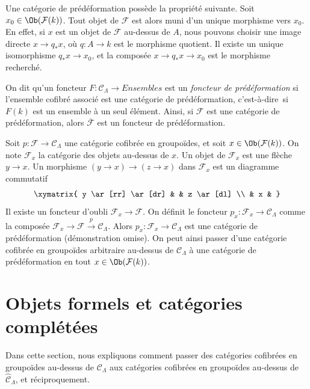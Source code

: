 \noindent
Une catégorie de prédéformation possède la propriété suivante.
Soit $x_0 \in \Ob(\mathcal{F}(k))$. Tout objet de $\mathcal{F}$ est alors
muni d'un unique morphisme vers $x_0$. En effet, si $x$ est un objet de
$\mathcal{F}$ au-dessus de $A$, nous pouvons choisir une image directe
$x \to q_*x$, où $q : A \to k$ est le morphisme quotient. Il existe un unique
isomorphisme $q_*x \to x_0$, et la composée $x \to q_*x \to x_0$ est le
morphisme recherché.

\begin{remark}
\label{remark-predeformation-functor}
On dit qu'un foncteur $F: \mathcal{C}_\Lambda \to \textit{Ensembles}$ est un
{\it foncteur de prédéformation} si l'ensemble cofibré associé est une
catégorie de prédéformation, c'est-à-dire\ si $F(k)$ est un ensemble à un
seul élément. Ainsi,
si $\mathcal{F}$ est une catégorie de prédéformation, alors
$\overline{\mathcal{F}}$ est un foncteur de prédéformation.
\end{remark}

\begin{remark}
\label{remark-localize-cofibered-groupoid}
Soit $p : \mathcal{F} \to \mathcal{C}_\Lambda$ une catégorie cofibrée en
groupoïdes, et soit $x \in \Ob(\mathcal{F}(k))$. On note
$\mathcal{F}_x$ la catégorie des objets au-dessus de $x$.
Un objet de $\mathcal{F}_x$ est une flèche $y \to x$.
Un morphisme $(y \to x) \to (z \to x)$ dans $\mathcal{F}_x$ est un diagramme
commutatif
$$
\xymatrix{
y \ar[rr] \ar[dr] & & z \ar[dl] \\
& x &
}
$$
Il existe un foncteur d'oubli $\mathcal{F}_x \to \mathcal{F}$. On définit le
foncteur $p_x : \mathcal{F}_x \to \mathcal{C}_\Lambda$ comme la composée
$\mathcal{F}_x \to \mathcal{F} \xrightarrow{p} \mathcal{C}_\Lambda$.
Alors $p_x : \mathcal{F}_x \to \mathcal{C}_\Lambda$ est une catégorie de
prédéformation (démonstration omise). On peut ainsi passer d'une catégorie
cofibrée en groupoïdes arbitraire au-dessus de $\mathcal{C}_\Lambda$ à une
catégorie de prédéformation en tout $x \in \Ob(\mathcal{F}(k))$.
\end{remark}






\section{Objets formels et catégories complétées}
\label{section-formal-objects}

\noindent
Dans cette section, nous expliquons comment passer des catégories cofibrées
en groupoïdes au-dessus de $\mathcal{C}_\Lambda$ aux catégories cofibrées en
groupoïdes au-dessus de $\widehat{\mathcal{C}}_\Lambda$, et réciproquement.

